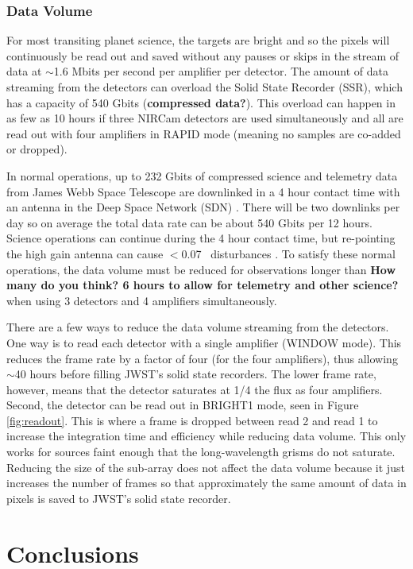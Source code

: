\documentclass[iop]{emulateapj}
\begin{document}
\subsubsection{Data Volume}
For most transiting planet science, the targets are bright and so the pixels will continuously be read out and saved without any pauses or skips in the stream of data at $\sim$1.6 Mbits per second per amplifier per detector.
The amount of data streaming from the detectors can overload the Solid State Recorder (SSR), which has a capacity of 540 Gbits \citep{johns2008L2comm} (\textbf{compressed data?}).
This overload can happen in as few as 10 hours if three NIRCam detectors are used simultaneously and all are read out with four amplifiers in RAPID mode (meaning no samples are co-added or dropped).

In normal operations, up to 232 Gbits of compressed science and telemetry data from James Webb Space Telescope are downlinked in a  4 hour contact time with an antenna in the Deep Space Network (SDN)  \citep{dashevsky2008groundflight}.
There will be two downlinks per day so on average the total data rate can be about 540 Gbits per 12 hours.
Science operations can continue during the 4 hour contact time, but re-pointing the high gain antenna can cause $<$0.07 \arcsec\ disturbances \citep{beichman2014pasp}.
To satisfy these normal operations, the data volume must be reduced for observations longer than \textbf{How many do you think? 6 hours to allow for telemetry and other science?} when using 3 detectors and 4 amplifiers simultaneously.

There are a few ways to reduce the data volume streaming from the detectors.
One way is to read each detector with a single amplifier (WINDOW mode).
This reduces the frame rate by a factor of four (for the four amplifiers), thus allowing $\sim$40 hours before filling JWST's solid state recorders.
The lower frame rate, however, means that the detector saturates at 1/4 the flux as four amplifiers.
Second, the detector can be read out in BRIGHT1 mode, seen in Figure \ref{fig:readout}.
This is where a frame is dropped between read 2 and read 1 to increase the integration time and efficiency while reducing data volume.
This only works for sources faint enough that the long-wavelength grisms do not saturate.
Reducing the size of the sub-array does not affect the data volume because it just increases the number of frames so that approximately the same amount of data in pixels is saved to JWST's solid state recorder.


\section{Conclusions}
\end{document}
